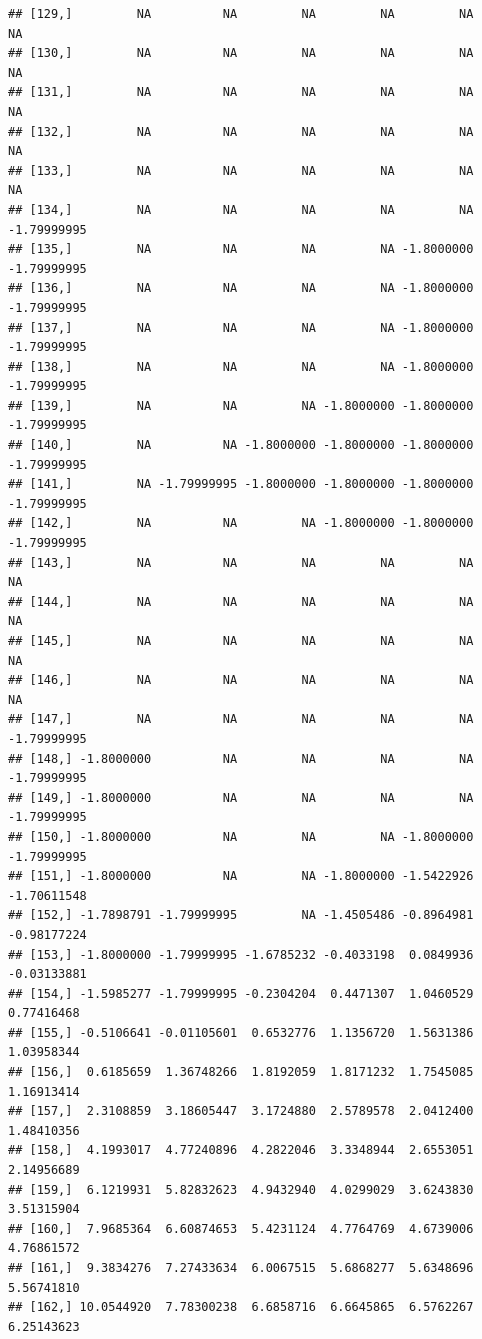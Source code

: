 \documentclass{article}\usepackage[]{graphicx}\usepackage[]{color}
\makeatletter
\newenvironment{kframe}{%
 \def\at@end@of@kframe{}%
 \ifinner\ifhmode%
  \def\at@end@of@kframe{\end{minipage}}%
  \begin{minipage}{\columnwidth}%
 \fi\fi%
 \def\FrameCommand##1{\hskip\@totalleftmargin \hskip-\fboxsep
 \colorbox{shadecolor}{##1}\hskip-\fboxsep
     \hskip-\linewidth \hskip-\@totalleftmargin \hskip\columnwidth}%
 \MakeFramed {\advance\hsize-\width
   \@totalleftmargin\z@ \linewidth\hsize
   \@setminipage}}%
 {\par\unskip\endMakeFramed%
 \at@end@of@kframe}
\newenvironment{knitrout}{}{} %
\makeatother
\begin{document}
\begin{knitrout}
\begin{kframe}
\begin{verbatim}
## [129,]         NA          NA         NA         NA         NA          NA
## [130,]         NA          NA         NA         NA         NA          NA
## [131,]         NA          NA         NA         NA         NA          NA
## [132,]         NA          NA         NA         NA         NA          NA
## [133,]         NA          NA         NA         NA         NA          NA
## [134,]         NA          NA         NA         NA         NA -1.79999995
## [135,]         NA          NA         NA         NA -1.8000000 -1.79999995
## [136,]         NA          NA         NA         NA -1.8000000 -1.79999995
## [137,]         NA          NA         NA         NA -1.8000000 -1.79999995
## [138,]         NA          NA         NA         NA -1.8000000 -1.79999995
## [139,]         NA          NA         NA -1.8000000 -1.8000000 -1.79999995
## [140,]         NA          NA -1.8000000 -1.8000000 -1.8000000 -1.79999995
## [141,]         NA -1.79999995 -1.8000000 -1.8000000 -1.8000000 -1.79999995
## [142,]         NA          NA         NA -1.8000000 -1.8000000 -1.79999995
## [143,]         NA          NA         NA         NA         NA          NA
## [144,]         NA          NA         NA         NA         NA          NA
## [145,]         NA          NA         NA         NA         NA          NA
## [146,]         NA          NA         NA         NA         NA          NA
## [147,]         NA          NA         NA         NA         NA -1.79999995
## [148,] -1.8000000          NA         NA         NA         NA -1.79999995
## [149,] -1.8000000          NA         NA         NA         NA -1.79999995
## [150,] -1.8000000          NA         NA         NA -1.8000000 -1.79999995
## [151,] -1.8000000          NA         NA -1.8000000 -1.5422926 -1.70611548
## [152,] -1.7898791 -1.79999995         NA -1.4505486 -0.8964981 -0.98177224
## [153,] -1.8000000 -1.79999995 -1.6785232 -0.4033198  0.0849936 -0.03133881
## [154,] -1.5985277 -1.79999995 -0.2304204  0.4471307  1.0460529  0.77416468
## [155,] -0.5106641 -0.01105601  0.6532776  1.1356720  1.5631386  1.03958344
## [156,]  0.6185659  1.36748266  1.8192059  1.8171232  1.7545085  1.16913414
## [157,]  2.3108859  3.18605447  3.1724880  2.5789578  2.0412400  1.48410356
## [158,]  4.1993017  4.77240896  4.2822046  3.3348944  2.6553051  2.14956689
## [159,]  6.1219931  5.82832623  4.9432940  4.0299029  3.6243830  3.51315904
## [160,]  7.9685364  6.60874653  5.4231124  4.7764769  4.6739006  4.76861572
## [161,]  9.3834276  7.27433634  6.0067515  5.6868277  5.6348696  5.56741810
## [162,] 10.0544920  7.78300238  6.6858716  6.6645865  6.5762267  6.25143623

\end{verbatim}
\end{kframe}
\end{knitrout}
\end{document}
